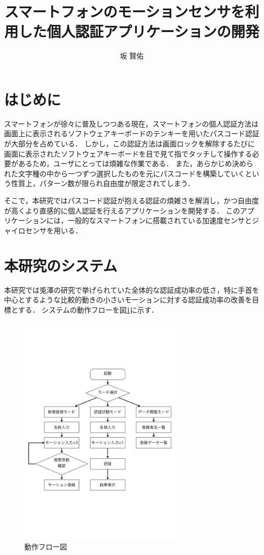 \documentclass[11pt]{jarticle}
\title{スマートフォンのモーションセンサを利用した個人認証アプリケーションの開発}
\author{\UTF{9AD9}坂 賢佑}
\begin{document}
\maketitle

\section{はじめに}
スマートフォンが徐々に普及しつつある現在，スマートフォンの個人認証方法は画面上に表示されるソフトウェアキーボードのテンキーを用いたパスコード認証が大部分を占めている．
しかし，この認証方法は画面ロックを解除するたびに画面に表示されたソフトウェアキーボードを目で見て指でタッチして操作する必要があるため，ユーザにとっては煩雑な作業である．
また，あらかじめ決められた文字種の中から一つずつ選択したものを元にパスコードを構築していくという性質上，パターン数が限られ自由度が限定されてしまう．

そこで，本研究ではパスコード認証が抱える認証の煩雑さを解消し，かつ自由度が高くより直感的に個人認証を行えるアプリケーションを開発する．
このアプリケーションには，一般的なスマートフォンに搭載されている加速度センサとジャイロセンサを用いる．

\section{本研究のシステム}
本研究では兎澤の研究\cite{tozawa}で挙げられていた全体的な認証成功率の低さ，特に手首を中心とするような比較的動きの小さいモーションに対する認証成功率の改善を目標とする．
システムの動作フローを図\ref{flow}に示す．

\begin{figure}
    \begin{center}
        \includegraphics[width=80mm, bb=0 183 590 670]{Flow.pdf}
        \caption{動作フロー図}
        \label{flow}
    \end{center}
\end{figure}
\end{document}
